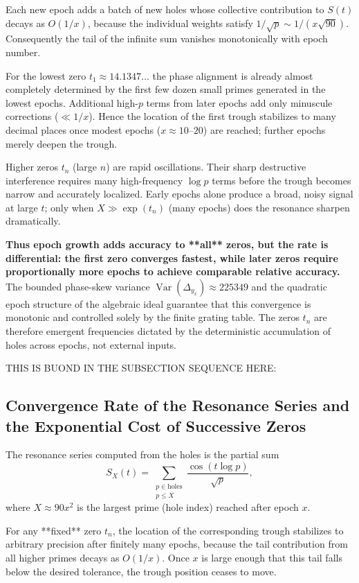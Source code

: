 \documentclass[11pt,a4paper]{article}
\begin{document}
Each new epoch adds a batch of new holes whose collective contribution to \(S(t)\) decays as \(O(1/x)\), because the individual weights satisfy \(1/\sqrt{p}\sim1/(x\sqrt{90})\). Consequently the tail of the infinite sum vanishes monotonically with epoch number.

For the lowest zero \(t_1\approx14.1347\ldots\) the phase alignment is already almost completely determined by the first few dozen small primes generated in the lowest epochs. Additional high-\(p\) terms from later epochs add only minuscule corrections (\(\ll1/x\)). Hence the location of the first trough stabilizes to many decimal places once modest epochs (\(x\approx10\)--\(20\)) are reached; further epochs merely deepen the trough.

Higher zeros \(t_n\) (large \(n\)) are rapid oscillations. Their sharp destructive interference requires many high-frequency \(\log p\) terms before the trough becomes narrow and accurately localized. Early epochs alone produce a broad, noisy signal at large \(t\); only when \(X\gg\exp(t_n)\) (many epochs) does the resonance sharpen dramatically.

\textbf{Thus epoch growth adds accuracy to **all** zeros, but the rate is differential: the first zero converges fastest, while later zeros require proportionally more epochs to achieve comparable relative accuracy.} The bounded phase-skew variance \(\operatorname{Var}(\Delta_{y_x})\approx225349\) and the quadratic epoch structure of the algebraic ideal guarantee that this convergence is monotonic and controlled solely by the finite grating table. The zeros \(t_n\) are therefore emergent frequencies dictated by the deterministic accumulation of holes across epochs, not external inputs.

THIS IS BUOND IN THE SUBSECTION SEQUENCE HERE:

\subsection{Convergence Rate of the Resonance Series and the Exponential Cost of Successive Zeros}

The resonance series computed from the holes is the partial sum
\[
S_X(t)=\sum_{\substack{p\in\text{holes}\\p\le X}}\frac{\cos(t\log p)}{\sqrt{p}},
\]
where \(X\approx90x^2\) is the largest prime (hole index) reached after epoch \(x\).

For any **fixed** zero \(t_n\), the location of the corresponding trough stabilizes to arbitrary precision after finitely many epochs, because the tail contribution from all higher primes decays as \(O(1/x)\). Once \(x\) is large enough that this tail falls below the desired tolerance, the trough position ceases to move.
\end{document}
